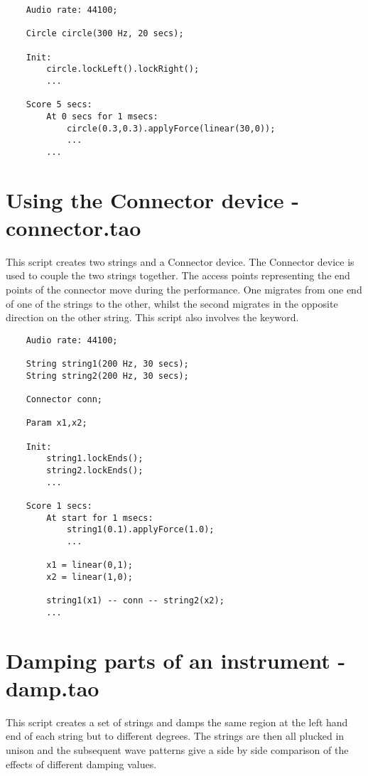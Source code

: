 \begin{verbatim}
    Audio rate: 44100;
        
    Circle circle(300 Hz, 20 secs);
        
    Init:
        circle.lockLeft().lockRight();
        ...
        
    Score 5 secs:
        At 0 secs for 1 msecs:
            circle(0.3,0.3).applyForce(linear(30,0));
            ...
        ...        
\end{verbatim}
 
\section{Using the Connector device - connector.tao}
This script creates two strings and a Connector device. The
Connector device is used to couple the two strings together. The
access points representing the end points of the connector move during
the performance. One migrates from one end of one of the strings to the
other, whilst the second migrates in the opposite direction on the other
string. This script also involves the  keyword.

\begin{verbatim}
    Audio rate: 44100;
        
    String string1(200 Hz, 30 secs);
    String string2(200 Hz, 30 secs);
        
    Connector conn;
        
    Param x1,x2;
        
    Init:
        string1.lockEnds();
        string2.lockEnds();
        ...
        
    Score 1 secs:
        At start for 1 msecs:
            string1(0.1).applyForce(1.0);
            ...
        
        x1 = linear(0,1);
        x2 = linear(1,0);
        
        string1(x1) -- conn -- string2(x2);
        ...    
\end{verbatim}
 
\section{Damping parts of an instrument - damp.tao}
This script creates a set of strings and damps the same region at the
left hand end of each string but to different degrees. The strings
are then all plucked in unison and the subsequent wave patterns give
a side by side comparison of the effects of different damping values.

